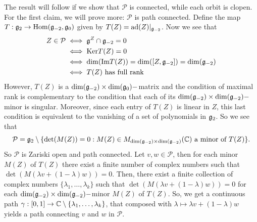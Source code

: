 \begin{itemize}
The result will follow if we show that $\mathcal{P}$ is connected, while each orbit is clopen. For the first claim, 
we will prove more: $\mathcal{P}$ is path connected. Define the map $T:\mathfrak{g}_{2}\to\text{Hom}(\mathfrak{g}_{-2},\mathfrak{g}_0)$ 
given by $T(Z)=\text{ad}(Z)|_{\mathfrak{g}_{-2}}$. Now we see that 
\begin{equation}
    \begin{split}
        Z\in\mathcal{P}&\iff \mathfrak{g}^Z\cap\mathfrak{g}_{-2}=0\\
        &\iff \text{Ker}T(Z) = 0\\
        &\iff \dim(\text{Im}T(Z))=\dim([Z,\mathfrak{g}_{-2}])=\dim(\mathfrak{g}_{-2})\\
        &\iff T(Z) \text{ has full rank}
    \end{split}
\end{equation}
However, $T(Z)$ is a $\dim(\mathfrak{g}_{-2})\times \dim(\mathfrak{g}_0)-$matrix and the condition of maximal rank is complementary 
to the condition that each of its $\dim(\mathfrak{g}_{-2})\times \dim(\mathfrak{g}_{-2})-$minor is singular. Moreover, since each entry of 
$T(Z)$ is linear in $Z$, this last condition is equivalent to the vanishing of a set of polynomials in $\mathfrak{g}_2$.
So we see that 
\begin{equation}
    \mathcal{P}=\mathfrak{g}_2\setminus 
    \{\det(M(Z))=0: M(Z)\in M_{\dim(\mathfrak{g}_{-2})\times \dim(\mathfrak{g}_{-2})}(\mathbb{C}) \text{ a minor of }T(Z)\}.
\end{equation}
So $\mathcal{P}$ is Zariski open and path connected. Let $v,w\in\mathcal{P}$, then for each minor $M(Z)$ of $T(Z)$ there 
exist a finite number of complex numbers 
such that $\det(M(\lambda v+(1-\lambda)w))=0$. Then, there exist a finite collection of complex numbers 
$\{\lambda_1,\dots,\lambda_k\}$ such that $\det(M(\lambda v+(1-\lambda)w))=0$ for each 
$\dim(\mathfrak{g}_{-2})\times \dim(\mathfrak{g}_{-2})-$minor $M(Z)$ of $T(Z)$.
So, we get a continuous path 
$\gamma:[0,1]\to\mathbb{C}\setminus\{\lambda_1,\dots,\lambda_k\}$, that composed with $\lambda\mapsto \lambda v+(1-\lambda)w$ yields 
a path connecting $v$ and $w$ in $\mathcal{P}$.\par 


\end{itemize}
